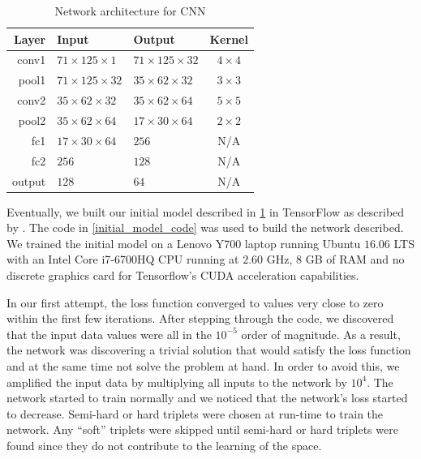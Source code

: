 \begin{table}[!ht]
	\centering
	\small
	\caption{Network architecture for CNN}
	\begin{tabular}{rllc}
		\toprule
		Layer    & Input                     & Output                    & Kernel       \\ \midrule
		conv1  & $ 71 \times 125 \times 1 $  & $ 71 \times 125 \times 32 $ & $ 4 \times 4 $ \\
		pool1  & $ 71 \times 125 \times 32 $ & $ 35 \times 62 \times 32 $  & $ 3 \times 3 $ \\
		conv2  & $ 35 \times 62 \times 32  $ & $ 35 \times 62 \times 64 $  & $ 5 \times 5 $ \\
		pool2  & $ 35 \times 62 \times 64 $  & $17 \times 30 \times 64$    & $ 2 \times 2 $ \\
		fc1    & $17 \times 30 \times 64$    & $ 256          $            & N/A            \\
		fc2    & $ 256 $                     & $ 128 $                    & N/A            \\
		output & $ 128 $                    & $ 64   $                    & N/A            \\ \bottomrule
	\end{tabular}
	\label{tab:network}
\end{table}

Eventually, we built our initial model described in \cref{tab:network} in TensorFlow as described by \citet{tensorflow}. The  code in \cref{initial_model_code} was used to build the network described. We trained the initial model on a Lenovo Y700 laptop running Ubuntu $16.06$ LTS with an Intel Core i7-6700HQ CPU running at $2.60$ GHz, $8$ GB of RAM and no discrete graphics card for Tensorflow's CUDA acceleration capabilities. 

In our first attempt, the loss function converged to values very close to zero within the first few iterations. After stepping through the code, we discovered that the input data values were all in the $10^{-5}$ order of magnitude. As a result, the network was discovering a trivial solution that would satisfy the loss function and at the same time not solve the problem at hand. In order to avoid this, we amplified the input data by multiplying all inputs to the network by $10^4$. The network started to train normally and we noticed that the network's loss started to decrease. Semi-hard or hard triplets were chosen at run-time to train the network. Any ``soft'' triplets were skipped until semi-hard or hard triplets were found since they do not contribute to the learning of the space. 

